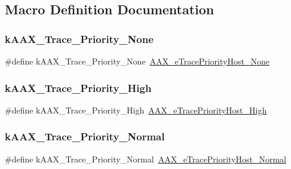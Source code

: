 \subsection{Macro Definition Documentation}
\mbox{\label{a00395_a262e3b6568764baa53f893d9dc6bbc23}} 
\subsubsection{\texorpdfstring{kAAX\_Trace\_Priority\_None}{kAAX\_Trace\_Priority\_None}}
{\footnotesize\ttfamily \#define k\+A\+A\+X\+\_\+\+Trace\+\_\+\+Priority\+\_\+\+None~\mbox{\hyperlink{a00491_a2dd667e4dea5781f38832fd9f1725f1ba906b1198b124fa17cd5821cbb140a63f}{A\+A\+X\+\_\+e\+Trace\+Priority\+Host\+\_\+\+None}}}

\mbox{\label{a00395_a5edd9a4ac559a4ef99a948c2ebd422db}} 
\subsubsection{\texorpdfstring{kAAX\_Trace\_Priority\_High}{kAAX\_Trace\_Priority\_High}}
{\footnotesize\ttfamily \#define k\+A\+A\+X\+\_\+\+Trace\+\_\+\+Priority\+\_\+\+High~\mbox{\hyperlink{a00491_a2dd667e4dea5781f38832fd9f1725f1baac76cc64a1379931edbc2bdc0f8aad66}{A\+A\+X\+\_\+e\+Trace\+Priority\+Host\+\_\+\+High}}}

\mbox{\label{a00395_a8a6953f26f36747357d5d95f96dcf68d}} 
\subsubsection{\texorpdfstring{kAAX\_Trace\_Priority\_Normal}{kAAX\_Trace\_Priority\_Normal}}
{\footnotesize\ttfamily \#define k\+A\+A\+X\+\_\+\+Trace\+\_\+\+Priority\+\_\+\+Normal~\mbox{\hyperlink{a00491_a2dd667e4dea5781f38832fd9f1725f1ba327226d6962ad7f297506697c2001ce0}{A\+A\+X\+\_\+e\+Trace\+Priority\+Host\+\_\+\+Normal}}}

